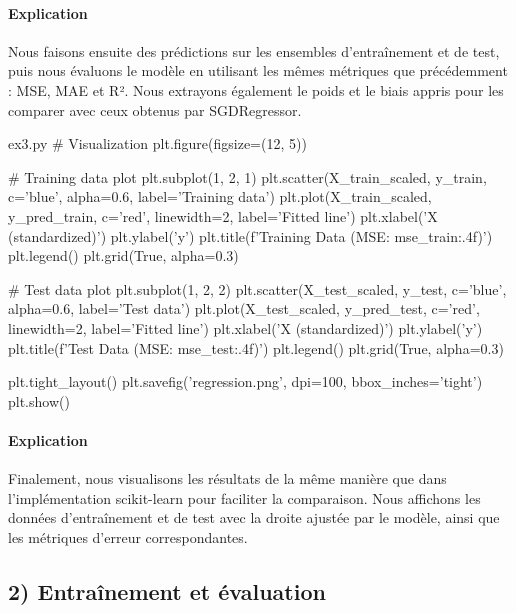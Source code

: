\documentclass[12pt,a4paper]{article}
\begin{document}
\paragraph{Explication}
Nous faisons ensuite des prédictions sur les ensembles d'entraînement et de test, puis nous évaluons le modèle en utilisant les mêmes métriques que précédemment : MSE, MAE et R².
Nous extrayons également le poids et le biais appris pour les comparer avec ceux obtenus par SGDRegressor.


\begin{codeholder}{ex3.py}
# Visualization
plt.figure(figsize=(12, 5))

# Training data plot
plt.subplot(1, 2, 1)
plt.scatter(X_train_scaled, y_train, c='blue',
            alpha=0.6, label='Training data')
plt.plot(X_train_scaled, y_pred_train, c='red',
         linewidth=2, label='Fitted line')
plt.xlabel('X (standardized)')
plt.ylabel('y')
plt.title(f'Training Data (MSE: {mse_train:.4f})')
plt.legend()
plt.grid(True, alpha=0.3)

# Test data plot
plt.subplot(1, 2, 2)
plt.scatter(X_test_scaled, y_test, c='blue', alpha=0.6, label='Test data')
plt.plot(X_test_scaled, y_pred_test, c='red', linewidth=2, label='Fitted line')
plt.xlabel('X (standardized)')
plt.ylabel('y')
plt.title(f'Test Data (MSE: {mse_test:.4f})')
plt.legend()
plt.grid(True, alpha=0.3)

plt.tight_layout()
plt.savefig('regression.png', dpi=100, bbox_inches='tight')
plt.show()
\end{codeholder}

\paragraph{Explication}
Finalement, nous visualisons les résultats de la même manière que dans l'implémentation scikit-learn pour faciliter la comparaison.
Nous affichons les données d'entraînement et de test avec la droite ajustée par le modèle, ainsi que les métriques d'erreur correspondantes.


\subsection*{2) Entraînement et évaluation}
\end{document}
